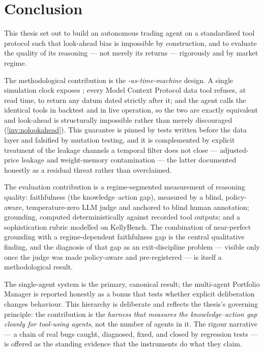 \chapter{Conclusion}
\label{ch:conclusion}

This thesis set out to build an autonomous trading agent on a standardised tool protocol such
that look-ahead bias is impossible by construction, and to evaluate the quality of its
reasoning --- not merely its returns --- rigorously and by market regime.

The methodological contribution is the \emph{\mcp-as-time-machine} design. A single simulation
clock exposes \tnow; every Model Context Protocol data tool refuses, at read time, to return
any datum dated strictly after it; and the agent calls the identical tools in backtest and in
live operation, so the two are exactly equivalent and look-ahead is structurally impossible
rather than merely discouraged (\cref{inv:nolookahead}). This guarantee is pinned by tests
written before the data layer and falsified by mutation testing, and it is complemented by
explicit treatment of the leakage channels a temporal filter does not close --- adjusted-price
leakage and weight-memory contamination --- the latter documented honestly as a residual
threat rather than overclaimed.

The evaluation contribution is a regime-segmented measurement of reasoning quality:
faithfulness (the knowledge--action gap), measured by a blind, policy-aware, temperature-zero
LLM judge and anchored to blind human annotation; grounding, computed deterministically against
recorded tool outputs; and a sophistication rubric modelled on KellyBench. The combination of
near-perfect grounding with a regime-dependent faithfulness gap is the central qualitative
finding, and the diagnosis of that gap as an exit-discipline problem --- visible only once the
judge was made policy-aware and pre-registered --- is itself a methodological result.

The single-agent system is the primary, canonical result; the multi-agent Portfolio Manager is
reported honestly as a bonus that tests whether explicit deliberation changes behaviour. This
hierarchy is deliberate and reflects the thesis's governing principle: the contribution is the
\emph{harness that measures the knowledge--action gap cleanly for tool-using agents}, not the
number of agents in it. The rigour narrative --- a chain of real bugs caught, diagnosed, fixed,
and closed by regression tests --- is offered as the standing evidence that the instruments do
what they claim.

